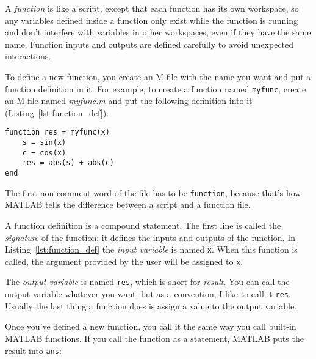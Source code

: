 A \emph{function} is like a script, except that each function has its own workspace, so any variables defined
inside a function only exist while the function is running and don't
interfere with variables in other workspaces, even if they have the
same name. 
Function inputs and outputs are defined carefully to avoid
unexpected interactions.

To define a new function, you create an M-file with the name you
want and put a function definition in it.  For example, to create
a function named \lstinline{myfunc}, create an M-file named \emph{myfunc.m}
and put the following definition into it (Listing~\ref{lst:function_def}):


\begin{lstlisting}[caption={A function definition}, label={lst:function_def}]
function res = myfunc(x)
    s = sin(x)
    c = cos(x)
    res = abs(s) + abs(c)
end
\end{lstlisting}

The first non-comment word of the file has to be \lstinline{function}, because
that's how MATLAB tells the difference between a script and a function
file.


A function definition is a compound statement.  The first line
is called the \emph{signature} of the function; it defines
the inputs and outputs of the function.  In Listing~\ref{lst:function_def} the \emph{input variable} is named \lstinline{x}.  When this function is called, the
argument provided by the user will be assigned to \lstinline{x}.



The \emph{output variable} is named \lstinline{res}, which is short for
\emph{result}.  You can call the output variable whatever you want, but
as a convention, I like to call it \lstinline{res}.  Usually the last
thing a function does is assign a value to the output \mbox{variable}.


Once you've defined a new function, you call it the same way you
call built-in MATLAB functions.  If you call the function as a statement,
MATLAB puts the result into \lstinline{ans}:

